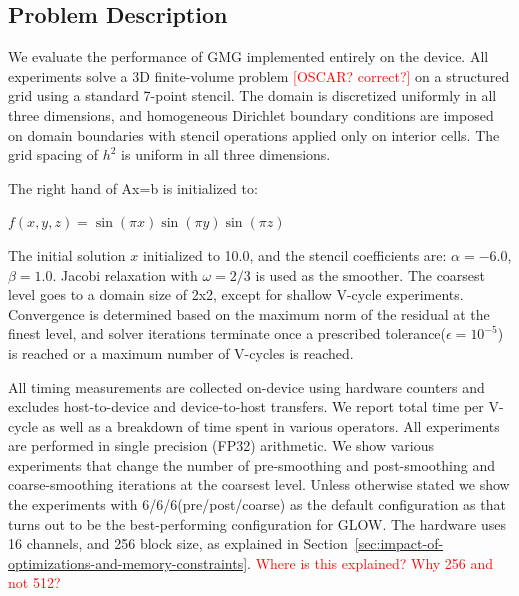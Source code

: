\documentclass[sigconf]{acmart}
\begin{document}
\subsection{Problem Description} 
We evaluate the performance of GMG %
implemented entirely on the device. All experiments solve a 3D finite-volume problem \textcolor{red}{[OSCAR? correct?]} on a structured grid using a standard 7-point stencil. The domain is discretized uniformly in all three dimensions, and homogeneous Dirichlet boundary conditions are imposed on domain boundaries with stencil operations applied only on interior cells. The grid spacing of $h^2$ is uniform in all three dimensions. 

The right hand of Ax=b is initialized to: 
\begin{center}
$f(x,y,z)=\sin(\pi x)\sin(\pi y)\sin(\pi z)$\\ 
\end{center}
The initial solution $x$ initialized to 10.0, and the stencil coefficients are: $\alpha = -6.0$, $\beta = 1.0$. Jacobi relaxation with $\omega=2/3$ is used as the smoother. The coarsest level goes to a domain size of 2x2, except for shallow V-cycle experiments. Convergence is determined based on the maximum norm of the residual at the finest level, and solver iterations terminate once a prescribed tolerance($\epsilon = 10^{-5}$) is reached or a maximum number of V-cycles is reached. 

All timing measurements are collected on-device using hardware counters and excludes host-to-device and device-to-host transfers. We report total time per V-cycle as well as a breakdown of time spent in various operators. All experiments are performed in single precision (FP32) arithmetic. We show various experiments that change the number of pre-smoothing and post-smoothing and coarse-smoothing iterations at the coarsest level. Unless otherwise stated we show the experiments with 6/6/6(pre/post/coarse) as the default configuration as that turns out to be the best-performing configuration for GLOW. The hardware uses 16 channels, and 256 block size, as explained in 
Section~\ref{sec:impact-of-optimizations-and-memory-constraints}. \textcolor{red}{Where is this explained?  Why 256 and not 512?} %
\end{document}

